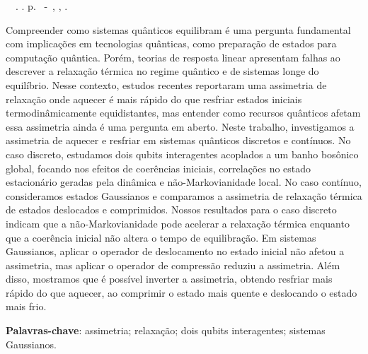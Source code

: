 \setlength{\absparsep}{18pt} %
\begin{resumo}
	\begin{flushleft} 
			\setlength{\absparsep}{0pt} %
			\SingleSpacing 
			\imprimirautorabr~~\textbf{\imprimirtituloresumo}.	\imprimirdata. \pageref{LastPage} p. 
			\imprimirtipotrabalho~-~\imprimirinstituicao, \imprimirlocal, \imprimirdata. 
 	\end{flushleft}
\OnehalfSpacing 			

Compreender como sistemas quânticos equilibram é uma pergunta fundamental com implicações em tecnologias quânticas, como preparação de estados para computação quântica. Porém, teorias de resposta linear apresentam falhas ao descrever a relaxação térmica no regime quântico e de sistemas longe do equilíbrio. Nesse contexto, estudos recentes reportaram uma assimetria de relaxação onde aquecer é mais rápido do que resfriar estados iniciais termodinâmicamente equidistantes, mas entender como recursos quânticos afetam essa assimetria ainda é uma pergunta em aberto. Neste trabalho, investigamos a assimetria de aquecer e resfriar em sistemas quânticos discretos e contínuos. No caso discreto, estudamos dois qubits interagentes acoplados a um banho bosônico global, focando nos efeitos de coerências iniciais, correlações no estado estacionário geradas pela dinâmica e não-Markovianidade local. No caso contínuo, consideramos estados Gaussianos e comparamos a assimetria de relaxação térmica de estados deslocados e comprimidos. Nossos resultados para o caso discreto indicam que a não-Markovianidade pode acelerar a relaxação térmica enquanto que a coerência inicial não altera o tempo de equilibração. Em sistemas Gaussianos, aplicar o operador de deslocamento no estado inicial não afetou a assimetria, mas aplicar o operador de compressão reduziu a assimetria. Além disso, mostramos que é possível inverter a assimetria, obtendo resfriar mais rápido do que aquecer, ao comprimir o estado mais quente e deslocando o estado mais frio.
 

 \textbf{Palavras-chave}: assimetria; relaxação; dois qubits interagentes; sistemas Gaussianos.
\end{resumo}